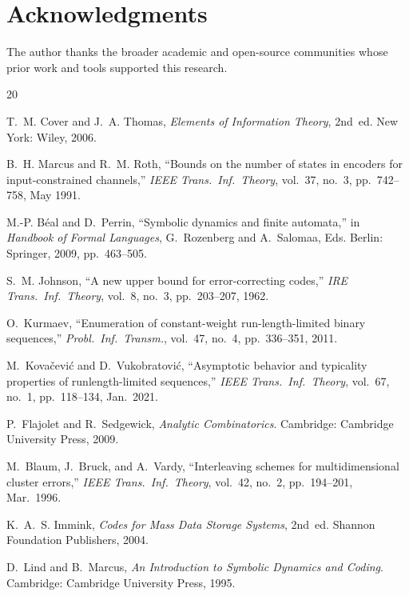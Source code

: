 \documentclass[a4paper,12pt]{article}
\begin{document}
\section*{Acknowledgments}
The author thanks the broader academic and open-source communities
whose prior work and tools supported this research.

\begin{thebibliography}{20}

T.~M. Cover and J.~A. Thomas,
\textit{Elements of Information Theory}, 2nd~ed.
New York: Wiley, 2006.

B.~H. Marcus and R.~M. Roth,
``Bounds on the number of states in encoders for input-constrained
channels,''
\textit{IEEE Trans.\ Inf.\ Theory}, vol.~37, no.~3, pp.~742--758,
May 1991.

M.-P. B\'{e}al and D.~Perrin,
``Symbolic dynamics and finite automata,''
in \textit{Handbook of Formal Languages},
G.~Rozenberg and A.~Salomaa, Eds.
Berlin: Springer, 2009, pp.~463--505.

S.~M. Johnson,
``A new upper bound for error-correcting codes,''
\textit{IRE Trans.\ Inf.\ Theory}, vol.~8, no.~3, pp.~203--207, 1962.

O.~Kurmaev,
``Enumeration of constant-weight run-length-limited binary sequences,''
\textit{Probl.\ Inf.\ Transm.}, vol.~47, no.~4, pp.~336--351, 2011.

M.~Kova\v{c}evi\'{c} and D.~Vukobratovi\'{c},
``Asymptotic behavior and typicality properties of runlength-limited
sequences,''
\textit{IEEE Trans.\ Inf.\ Theory}, vol.~67, no.~1, pp.~118--134,
Jan.~2021.

P.~Flajolet and R.~Sedgewick,
\textit{Analytic Combinatorics}.
Cambridge: Cambridge University Press, 2009.

M.~Blaum, J.~Bruck, and A.~Vardy,
``Interleaving schemes for multidimensional cluster errors,''
\textit{IEEE Trans.\ Inf.\ Theory}, vol.~42, no.~2, pp.~194--201,
Mar.~1996.

K.~A.~S. Immink,
\textit{Codes for Mass Data Storage Systems}, 2nd~ed.
Shannon Foundation Publishers, 2004.

D.~Lind and B.~Marcus,
\textit{An Introduction to Symbolic Dynamics and Coding}.
Cambridge: Cambridge University Press, 1995.


\end{thebibliography}
\end{document}
